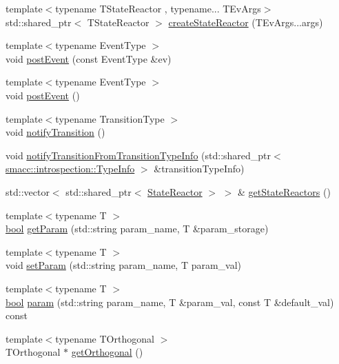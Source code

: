 \begin{DoxyCompactItemize}
\item 
{\footnotesize template$<$typename T\+State\+Reactor , typename... T\+Ev\+Args$>$ }\\std\+::shared\+\_\+ptr$<$ T\+State\+Reactor $>$ \hyperlink{classsmacc_1_1ISmaccState_a520466fc0f226011e84ea593b53e43a4}{create\+State\+Reactor} (T\+Ev\+Args...\+args)
\item 
{\footnotesize template$<$typename Event\+Type $>$ }\\void \hyperlink{classsmacc_1_1ISmaccState_acef404ab3766ddf2892e8dad14a4a7cf}{post\+Event} (const Event\+Type \&ev)
\item 
{\footnotesize template$<$typename Event\+Type $>$ }\\void \hyperlink{classsmacc_1_1ISmaccState_a1308e7a5348de1870c26b3b00a92cf55}{post\+Event} ()
\item 
{\footnotesize template$<$typename Transition\+Type $>$ }\\void \hyperlink{classsmacc_1_1ISmaccState_a98df316afd79180d3c27a15a7d5dd1cf}{notify\+Transition} ()
\item 
void \hyperlink{classsmacc_1_1ISmaccState_acb3dd7d402c634004ae3b67a01169438}{notify\+Transition\+From\+Transition\+Type\+Info} (std\+::shared\+\_\+ptr$<$ \hyperlink{classsmacc_1_1introspection_1_1TypeInfo}{smacc\+::introspection\+::\+Type\+Info} $>$ \&transition\+Type\+Info)
\item 
std\+::vector$<$ std\+::shared\+\_\+ptr$<$ \hyperlink{classsmacc_1_1StateReactor}{State\+Reactor} $>$ $>$ \& \hyperlink{classsmacc_1_1ISmaccState_acc40f4b3dd02a39242c7e23fe13c3e16}{get\+State\+Reactors} ()
\item 
{\footnotesize template$<$typename T $>$ }\\\hyperlink{classbool}{bool} \hyperlink{classsmacc_1_1ISmaccState_abbb3a24b912c6e8de28f7b86123b6357}{get\+Param} (std\+::string param\+\_\+name, T \&param\+\_\+storage)
\item 
{\footnotesize template$<$typename T $>$ }\\void \hyperlink{classsmacc_1_1ISmaccState_a0b6c531ca8c446052022308548f55b92}{set\+Param} (std\+::string param\+\_\+name, T param\+\_\+val)
\item 
{\footnotesize template$<$typename T $>$ }\\\hyperlink{classbool}{bool} \hyperlink{classsmacc_1_1ISmaccState_a4982f2187ed6da337462721146e8ef70}{param} (std\+::string param\+\_\+name, T \&param\+\_\+val, const T \&default\+\_\+val) const 
\item 
{\footnotesize template$<$typename T\+Orthogonal $>$ }\\T\+Orthogonal $\ast$ \hyperlink{classsmacc_1_1ISmaccState_afc5c5683cbe39964a52fc3a2553196d2}{get\+Orthogonal} ()
\end{DoxyCompactItemize}
